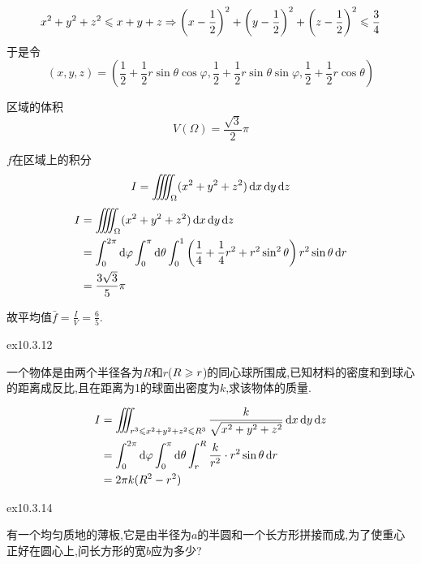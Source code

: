 \begin{solution}
    $$x^2 + y^2 + z^2 \leqslant x+ y +z \Rightarrow \left( x- \frac{1}{2} \right)^2 + \left( y - \frac{1}{2} \right)^2 + \left( z - \frac{1}{2} \right)^2 \leqslant \frac{3}{4}$$
    于是令$$(x,y,z) = \left( \frac{1}{2} + \frac{1}{2} r \sin \theta \cos \varphi, \frac{1}{2} + \frac{1}{2} r \sin \theta \sin \varphi, \frac{1}{2} + \frac{1}{2} r \cos \theta \right)$$

    区域的体积$$V(\Omega) = \frac{\sqrt 3}{2} \pi$$

    $f$在区域上的积分
    $$I = \iiiint_{\Omega} (x^2 + y^2 + z^2) \operatorname{d\!} x \operatorname{d\!} y \operatorname{d\!} z$$
    \begin{align*}
        I &= \iiiint_{\Omega} (x^2 + y^2 + z^2) \operatorname{d\!} x \operatorname{d\!} y \operatorname{d\!} z \\
        &= \int_{0}^{2\pi} \operatorname{d\!} \varphi \int_{0}^{\pi} \operatorname{d\!} \theta \int_{0}^{1} \left( \frac{1}{4} + \frac{1}{4} r^2 + r^2 \sin^2 \theta \right) r^2 \sin \theta \operatorname{d\!} r \\
        &= \frac{3 \sqrt 3}{5} \pi
    \end{align*}

    故平均值$\bar f = \frac{I}{V} = \frac65$.
\end{solution}

\begin{exercise}
    {ex10.3.12}

    一个物体是由两个半径各为$R$和$r$($R \geqslant r$)的同心球所围成,已知材料的密度和到球心的距离成反比,且在距离为1的球面出密度为$k$,求该物体的质量.
\end{exercise}

\begin{solution}
    \begin{align*}
    I &= \iiint_{r^3 \leqslant x^2 + y^2 + z^2 \leqslant R^3} \frac{k}{\sqrt{x^2 + y^2 + z^2}} \operatorname{d\!} x \operatorname{d\!} y \operatorname{d\!} z \\
    &= \int_{0}^{2\pi} \operatorname{d\!} \varphi \int_0^{\pi} \operatorname{d\!} \theta \int_{r}^{R} \frac{k}{r^2} \cdot r^2 \sin \theta \operatorname{d\!} r \\
    &=2 \pi k (R^2 - r^2)
\end{align*}
\end{solution}

\begin{exercise}
    {ex10.3.14}

    有一个均匀质地的薄板,它是由半径为$a$的半圆和一个长方形拼接而成,为了使重心正好在圆心上,问长方形的宽$b$应为多少?
\end{exercise}

